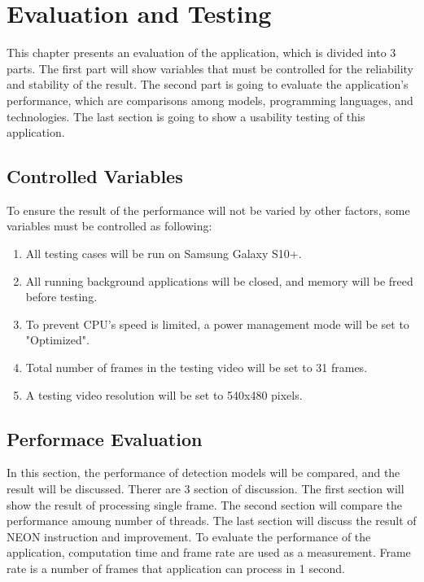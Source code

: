 \chapter{Evaluation and Testing}\label{testing}

    This chapter presents an evaluation of the application, which is divided into 3 parts.
    The first part will show variables that must be controlled for the reliability and stability of the result.
    The second part is going to evaluate the application's performance,
    which are comparisons among models, programming languages, and technologies.
    The last section is going to show a usability testing of this application.

    \section{Controlled Variables}
        To ensure the result of the performance will not be varied by other factors, some variables must be controlled as following:
        \begin{enumerate}
            \item All testing cases will be run on Samsung Galaxy S10+.
            \item All running background applications will be closed, and memory will be freed before testing.
            \item To prevent CPU's speed is limited, a power management mode will be set to "Optimized".
            \item Total number of frames in the testing video will be set to 31 frames.
            \item A testing video resolution will be set to 540x480 pixels.
        \end{enumerate}

    \section{Performace Evaluation}
        In this section, the performance of detection models will be compared, and the result will be discussed.
        Therer are 3 section of discussion. The first section will show the result of processing single frame.
        The second section will compare the performance amoung number of threads.
        The last section will discuss the result of NEON instruction and improvement.
        To evaluate the performance of the application, computation time and frame rate are used as a measurement.
        Frame rate is a number of frames that application can process in 1 second.

